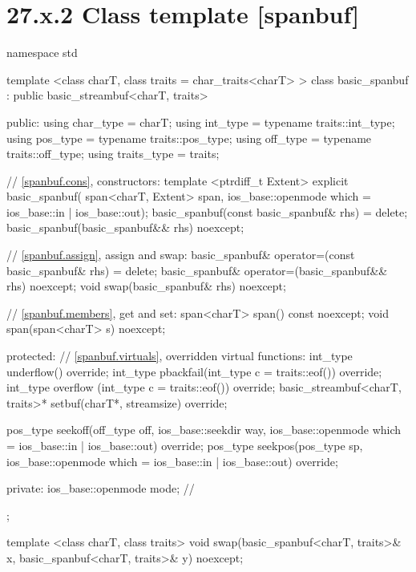 \documentclass[ebook,11pt,article]{memoir}
\begin{document}
\section{27.x.2 Class template  [spanbuf]}
\begin{codeblock}
namespace std {
  template <class charT, class traits = char_traits<charT> >
  class basic_spanbuf
    : public basic_streambuf<charT, traits> {
  public:
    using char_type      = charT;
    using int_type       = typename traits::int_type;
    using pos_type       = typename traits::pos_type;
    using off_type       = typename traits::off_type;
    using traits_type    = traits;

    // \ref{spanbuf.cons}, constructors:
    template <ptrdiff_t Extent>
    explicit basic_spanbuf(
      span<charT, Extent> span,
      ios_base::openmode which = ios_base::in | ios_base::out);
    basic_spanbuf(const basic_spanbuf& rhs) = delete;
    basic_spanbuf(basic_spanbuf&& rhs) noexcept;

    // \ref{spanbuf.assign}, assign and swap:
    basic_spanbuf& operator=(const basic_spanbuf& rhs) = delete;
    basic_spanbuf& operator=(basic_spanbuf&& rhs) noexcept;
    void swap(basic_spanbuf& rhs) noexcept;

    // \ref{spanbuf.members}, get and set:
    span<charT> span() const noexcept;
    void span(span<charT> s) noexcept;

  protected:
    // \ref{spanbuf.virtuals}, overridden virtual functions:
    int_type underflow() override;
    int_type pbackfail(int_type c = traits::eof()) override;
    int_type overflow (int_type c = traits::eof()) override;
    basic_streambuf<charT, traits>* setbuf(charT*, streamsize) override;

    pos_type seekoff(off_type off, ios_base::seekdir way,
                     ios_base::openmode which
                      = ios_base::in | ios_base::out) override;
    pos_type seekpos(pos_type sp,
                     ios_base::openmode which
                      = ios_base::in | ios_base::out) override;

  private:
    ios_base::openmode mode;  // \expos
  };

  template <class charT, class traits>
    void swap(basic_spanbuf<charT, traits>& x,
              basic_spanbuf<charT, traits>& y) noexcept;
}
\end{codeblock}
\end{document}
